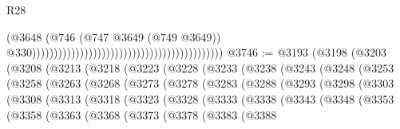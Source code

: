 \begin{lexlean}{R28}
\begin{coremodule}
                                                                                        (@3648
                                                                                          (@746
                                                                                            (@747
                                                                                              @3649
                                                                                              (@749
                                                                                                @3649))
                                                                                            @330))))))))))))))))))))))))))))))))))))))))))))
@3746 := @3193
    (@3198
      (@3203
        (@3208
          (@3213
            (@3218
              (@3223
                (@3228
                  (@3233
                    (@3238
                      (@3243
                        (@3248
                          (@3253
                            (@3258
                              (@3263
                                (@3268
                                  (@3273
                                    (@3278
                                      (@3283
                                        (@3288
                                          (@3293
                                            (@3298
                                              (@3303
                                                (@3308
                                                  (@3313
                                                    (@3318
                                                      (@3323
                                                        (@3328
                                                          (@3333
                                                            (@3338
                                                              (@3343
                                                                (@3348
                                                                  (@3353
                                                                    (@3358
                                                                      (@3363
                                                                        (@3368
                                                                          (@3373
                                                                            (@3378
                                                                              (@3383
                                                                                (@3388

\end{coremodule}
\end{lexlean}
